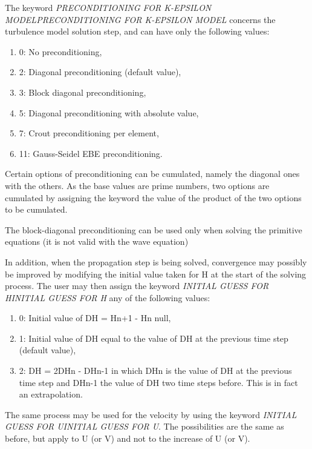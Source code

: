 \documentclass{article} %
\begin{document}
 The keyword \textit{PRECONDITIONING FOR K-EPSILON MODELPRECONDITIONING FOR K-EPSILON MODEL} concerns the turbulence model solution step, and can have only the following values:

\begin{enumerate}
\item  0: No preconditioning,

\item  2: Diagonal preconditioning (default value),

\item  3: Block diagonal preconditioning,

\item  5: Diagonal preconditioning with absolute value,

\item  7: Crout preconditioning per element,

\item  11: Gauss-Seidel EBE preconditioning.
\end{enumerate}

 Certain options of preconditioning can be cumulated, namely the diagonal ones with the others. As the base values are prime numbers, two options are cumulated by assigning the keyword the value of the product of the two options to be cumulated.

 The block-diagonal preconditioning can be used only when solving the primitive equations (it is not valid with the wave equation)

 In addition, when the propagation step is being solved, convergence may possibly be improved by modifying the initial value taken for H at the start of the solving process. The user may then assign the keyword \textit{INITIAL GUESS FOR HINITIAL GUESS FOR H} any of the following values:

\begin{enumerate}
\item  0: Initial value of DH = Hn+1 - Hn  null,

\item  1: Initial value of DH equal to the value of DH at the previous time step (default value),

\item  2: DH = 2DHn - DHn-1 in which DHn is the value of DH at the previous time step and DHn-1 the value of DH two time steps before. This is in fact an extrapolation.
\end{enumerate}

 The same process may be used for the velocity by using the keyword \textit{INITIAL GUESS FOR UINITIAL GUESS FOR U}. The possibilities are the same as before, but apply to U (or V) and not to the increase of U (or V).
\end{document}

